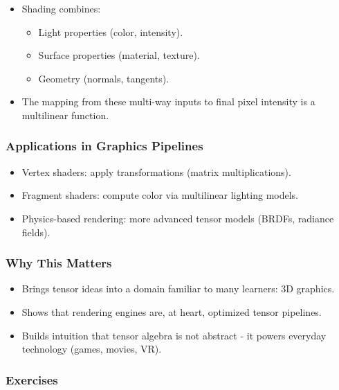 \documentclass[
  letterpaper,
  DIV=11,
  numbers=noendperiod]{scrreprt}
\providecommand{\tightlist}{%
  \setlength{\itemsep}{0pt}\setlength{\parskip}{0pt}}
\begin{document}
\begin{itemize}
\item
  Shading combines:

  \begin{itemize}
  \tightlist
  \item
    Light properties (color, intensity).
  \item
    Surface properties (material, texture).
  \item
    Geometry (normals, tangents).
  \end{itemize}
\item
  The mapping from these multi-way inputs to final pixel intensity is a
  multilinear function.
\end{itemize}

\subsubsection{Applications in Graphics
Pipelines}\label{applications-in-graphics-pipelines}

\begin{itemize}
\tightlist
\item
  Vertex shaders: apply transformations (matrix multiplications).
\item
  Fragment shaders: compute color via multilinear lighting models.
\item
  Physics-based rendering: more advanced tensor models (BRDFs, radiance
  fields).
\end{itemize}

\subsubsection{Why This Matters}\label{why-this-matters-53}

\begin{itemize}
\tightlist
\item
  Brings tensor ideas into a domain familiar to many learners: 3D
  graphics.
\item
  Shows that rendering engines are, at heart, optimized tensor
  pipelines.
\item
  Builds intuition that tensor algebra is not abstract - it powers
  everyday technology (games, movies, VR).
\end{itemize}

\subsubsection{Exercises}\label{exercises-67}
\end{document}
